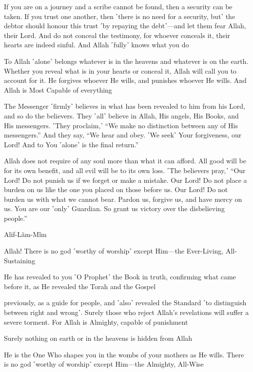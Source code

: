 If you are on a journey and a scribe cannot be found, then a security can be taken. If you trust one another, then ˹there is no need for a security, but˺ the debtor should honour this trust ˹by repaying the debt˺—and let them fear Allah, their Lord. And do not conceal the testimony, for whoever conceals it, their hearts are indeed sinful. And Allah ˹fully˺ knows what you do

To Allah ˹alone˺ belongs whatever is in the heavens and whatever is on the earth. Whether you reveal what is in your hearts or conceal it, Allah will call you to account for it. He forgives whoever He wills, and punishes whoever He wills. And Allah is Most Capable of everything

The Messenger ˹firmly˺ believes in what has been revealed to him from his Lord, and so do the believers. They ˹all˺ believe in Allah, His angels, His Books, and His messengers. ˹They proclaim,˺ “We make no distinction between any of His messengers.” And they say, “We hear and obey. ˹We seek˺ Your forgiveness, our Lord! And to You ˹alone˺ is the final return.”

Allah does not require of any soul more than what it can afford. All good will be for its own benefit, and all evil will be to its own loss. ˹The believers pray,˺ “Our Lord! Do not punish us if we forget or make a mistake. Our Lord! Do not place a burden on us like the one you placed on those before us. Our Lord! Do not burden us with what we cannot bear. Pardon us, forgive us, and have mercy on us. You are our ˹only˺ Guardian. So grant us victory over the disbelieving people.”

Alif-Lãm-Mĩm

Allah! There is no god ˹worthy of worship˺ except Him—the Ever-Living, All-Sustaining

He has revealed to you ˹O Prophet˺ the Book in truth, confirming what came before it, as He revealed the Torah and the Gospel

previously, as a guide for people, and ˹also˺ revealed the Standard ˹to distinguish between right and wrong˺. Surely those who reject Allah’s revelations will suffer a severe torment. For Allah is Almighty, capable of punishment

Surely nothing on earth or in the heavens is hidden from Allah

He is the One Who shapes you in the wombs of your mothers as He wills. There is no god ˹worthy of worship˺ except Him—the Almighty, All-Wise

